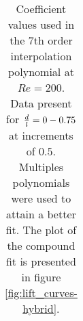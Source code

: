 \begin{table}[ht]
\begin{center}
\begin{tabular}{c c c c c c}
          
  
  
\hline %


\end{tabular}

\caption{Coefficient values used in the 7th order interpolation polynomial at $Re=200$. Data present for $\frac{d}{l}=0-0.75$ at increments of $0.5$. Multiples polynomials were used to attain a better fit. The plot of the compound fit is presented in figure \ref{fig:lift_curves-hybrid}.} 
 
\label{table:cy-coefficients-hybrid} %
\end{center}
\end{table}

